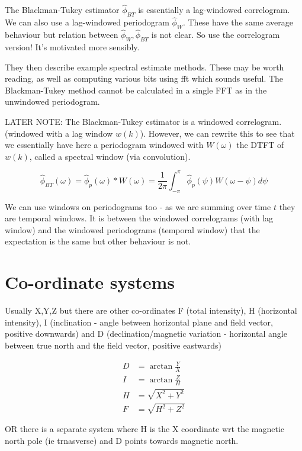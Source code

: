 \documentclass[11pt]{article}
\begin{document}
The Blackman-Tukey estimator $\hat{\phi}_{BT}$ is essentially a lag-windowed correlogram. We can also use a
lag-windowed periodogram $\hat{\phi}_W$. These have the same average behaviour but relation
between $\hat{\phi}_W, \hat{\phi}_{BT}$ is not clear. So use the correlogram version! It's
motivated more sensibly.

They then {\color{red} describe example spectral estimate methods}. These may be worth reading,
as well as {\color{red} computing various bits using fft} which sounds useful. The Blackman-Tukey
method cannot be calculated in a single FFT as in the unwindowed periodogram.


LATER NOTE: 
The Blackman-Tukey estimator is a windowed correlogram. (windowed with a lag window $w(k)$).
However, we can rewrite this to see that we essentially have here a periodogram windowed with
$W(\omega)$ the DTFT of $w(k)$, called a spectral window (via convolution).

\begin{equation}
    \hat{\phi}_{BT} (\omega) = \hat{\phi}_p ( \omega) * W(\omega) = \frac{1}{2 \pi} \int_{-
    \pi}^{\pi} \hat{\phi}_p (\psi) W (\omega - \psi ) d \psi
\end{equation}

We can use windows on periodograms too - as we are summing over time $t$ they are temporal
windows. It is between the windowed correlograms (with lag window) and the windowed periodograms
(temporal window) that the expectation is the same but other behaviour is not. 


\section{Co-ordinate systems}
Usually X,Y,Z but there are other co-ordinates F (total intensity), H (horizontal intensity),
I (inclination - angle between horizontal plane and field vector, positive downwards) and D
(declination/magnetic variation - horizontal angle between true north and the field vector,
positive eastwards)

\begin{align*}
    D &= \arctan{ \frac{Y}{X} } \\
    I &= \arctan{ \frac{Z}{H} } \\
    H &= \sqrt{ X^2 + Y^2 } \\
    F &= \sqrt{H^2 + Z^2 }
\end{align*}


OR there is a separate system where H is the X coordinate wrt the magnetic north pole (ie
trnasverse) and D points towards magnetic north.
\end{document}
